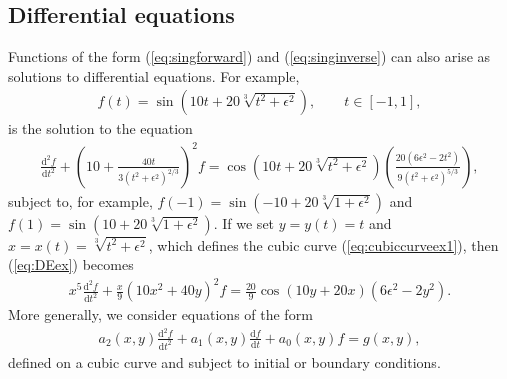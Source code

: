 \documentclass{amsart}
\theoremstyle{remark}
\begin{document}
\subsection{Differential equations}

Functions of the form (\ref{eq:singforward}) and (\ref{eq:singinverse}) can also arise as solutions to differential equations. For example, 
\begin{align*}
f(t) = \sin(10t + 20\sqrt[3]{t^2 + \epsilon^2}), \qquad t \in [-1, 1],
\end{align*}
is the solution to the equation
\begin{align}
\frac{\mathrm{d}^2f}{\mathrm{d}t^2} + \left(10 + \frac{40t}{3\left(t^2 + \epsilon^2 \right)^{2/3}}  \right)^2 f = \cos(10t + 20\sqrt[3]{t^2 + \epsilon^2})\left( \frac{20(6\epsilon^2 - 2t^2)}{9\left(t^2 + \epsilon^2 \right)^{5/3}} \right),  \label{eq:DEex}
\end{align}
subject to, for example, $f(-1) = \sin(-10+ 20\sqrt[3]{1 +\epsilon^2})$ and $f(1) = \sin(10+ 20\sqrt[3]{1 +\epsilon^2})$.  If we set $y = y(t) = t$ and $x = x(t) = \sqrt[3]{t^2 + \epsilon^2}$, which defines the cubic curve (\ref{eq:cubiccurveex1}), then (\ref{eq:DEex}) becomes
\begin{align*}
x^5\frac{\mathrm{d}^2f}{\mathrm{d}t^2} + \frac{x}{9}\left(10x^2 + 40y  \right)^2 f = \frac{20}{9}\cos(10y + 20x)\left(6\epsilon^2 - 2y^2\right). 
\end{align*}
More generally, we consider equations of the form
\begin{align}
a_2(x,y) \frac{\mathrm{d}^2f}{\mathrm{d}t^2} + a_1(x,y) \frac{\mathrm{d}f}{\mathrm{d}t} + a_0(x,y)f = g(x,y),  \label{eq:2ndlin}
\end{align}
defined on a cubic curve and subject to initial or boundary conditions. 
\end{document}
